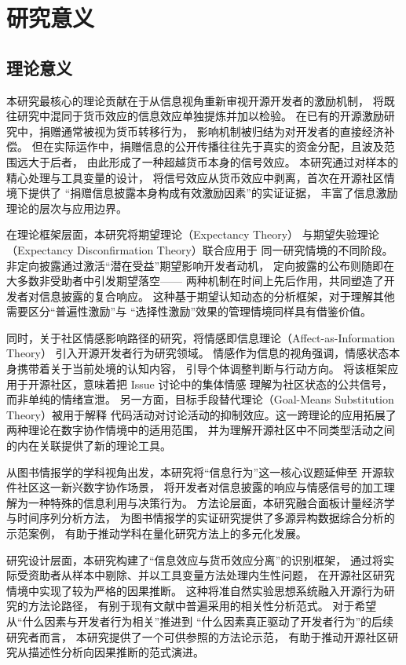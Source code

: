 \section{研究意义}

\subsection{理论意义}

本研究最核心的理论贡献在于从信息视角重新审视开源开发者的激励机制，
将既往研究中混同于货币效应的信息效应单独提炼并加以检验。
在已有的开源激励研究中，捐赠通常被视为货币转移行为，
影响机制被归结为对开发者的直接经济补偿\cite{zhang2022who,wang2022influence}。
但在实际运作中，捐赠信息的公开传播往往先于真实的资金分配，且波及范围远大于后者，
由此形成了一种超越货币本身的信号效应。
本研究通过对样本的精心处理与工具变量的设计，
将信号效应从货币效应中剥离，首次在开源社区情境下提供了
“捐赠信息披露本身构成有效激励因素”的实证证据，
丰富了信息激励理论的层次与应用边界。

在理论框架层面，本研究将期望理论（Expectancy Theory）
与期望失验理论（Expectancy Disconfirmation Theory）联合应用于
同一研究情境的不同阶段。非定向披露通过激活“潜在受益”期望影响开发者动机，
定向披露的公布则随即在大多数非受助者中引发期望落空——
两种机制在时间上先后作用，共同塑造了开发者对信息披露的复合响应。
这种基于期望认知动态的分析框架，对于理解其他需要区分“普遍性激励”与
“选择性激励”效果的管理情境同样具有借鉴价值。

同时，关于社区情感影响路径的研究，将情感即信息理论（Affect-as-Information Theory）
引入开源开发者行为研究领域。
情感作为信息的视角强调，情感状态本身携带着关于当前处境的认知内容，
引导个体调整判断与行动方向\cite{schwarz1983moods}。
将该框架应用于开源社区，意味着把 Issue 讨论中的集体情感
理解为社区状态的公共信号，而非单纯的情绪宣泄。
另一方面，目标手段替代理论（Goal-Means Substitution Theory）被用于解释
代码活动对讨论活动的抑制效应。这一跨理论的应用拓展了两种理论在数字协作情境中的适用范围，
并为理解开源社区中不同类型活动之间的内在关联提供了新的理论工具。

从图书情报学的学科视角出发，本研究将“信息行为”这一核心议题延伸至
开源软件社区这一新兴数字协作场景，
将开发者对信息披露的响应与情感信号的加工理解为一种特殊的信息利用与决策行为。
方法论层面，本研究融合面板计量经济学与时间序列分析方法，
为图书情报学的实证研究提供了多源异构数据综合分析的示范案例，
有助于推动学科在量化研究方法上的多元化发展。

研究设计层面，本研究构建了“信息效应与货币效应分离”的识别框架，
通过将实际受资助者从样本中剔除、并以工具变量方法处理内生性问题，
在开源社区研究情境中实现了较为严格的因果推断。
这种将准自然实验思想系统融入开源行为研究的方法论路径，
有别于现有文献中普遍采用的相关性分析范式。
对于希望从“什么因素与开发者行为相关”推进到
“什么因素真正驱动了开发者行为”的后续研究者而言，
本研究提供了一个可供参照的方法论示范，
有助于推动开源社区研究从描述性分析向因果推断的范式演进。

